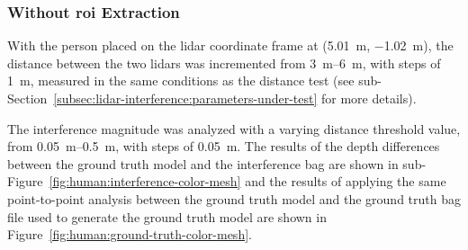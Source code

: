 \subsubsection{Without \acs{roi} Extraction}
With the person placed on the \ac{lidar} coordinate frame at (\SI{5.01}{\meter}, \SI{-1.02}{\meter}), the distance between the two \acp{lidar} was incremented from \SIrange{3}{6}{\meter}, with steps of \SI{1}{\meter}, measured in the same conditions as the distance test (see sub-Section~\ref{subsec:lidar-interference:parameters-under-test} for more details). 

The interference magnitude was analyzed with a varying distance threshold value, from \SIrange{0.05}{0.5}{\meter}, with steps of \SI{0.05}{\meter}. The results of the depth differences between the ground truth model and the interference bag are shown in sub-Figure~\ref{fig:human:interference-color-mesh} and the results of applying the same point-to-point analysis between the ground truth model and the ground truth bag file used to generate the ground truth model are shown in Figure~\ref{fig:human:ground-truth-color-mesh}.

